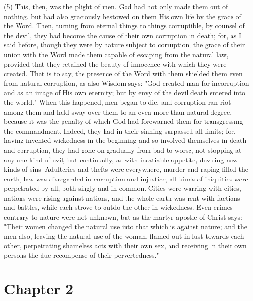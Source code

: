 \documentclass[9pt, twocolumn, oneside, a4paper]{memoir}
\begin{document}
\textsc{(5)} This, then, was the plight of men. God had not only       made them out of nothing, but had also graciously bestowed on them His own life       by the grace of the Word. Then, turning from eternal things to things       corruptible, by counsel of the devil, they had become the cause of their own       corruption in death; for, as I said before, though they were by nature subject       to corruption, the grace of their union with the Word made them capable of       escaping from the natural law, provided that they retained the beauty of       innocence with which they were created. That is to say, the presence of the Word       with them shielded them even from natural corruption, as also Wisdom says:       "God created man for incorruption and as an image of       His own eternity; but by envy of the devil death entered into the world."       When this happened, men began to die, and corruption ran riot among them and held       sway over them to an even more than natural degree, because it was the penalty       of which God had forewarned them for transgressing the commandment. Indeed, they       had in their sinning surpassed all limits; for, having invented wickedness in       the beginning and so involved themselves in death and corruption, they had gone       on gradually from bad to worse, not stopping at any one kind of evil, but       continually, as with insatiable appetite, devising new kinds of sins. Adulteries       and thefts were everywhere, murder and raping filled the earth, law was       disregarded in corruption and injustice, all kinds of iniquities were       perpetrated by all, both singly and in common. Cities were warring with cities,       nations were rising against nations, and the whole earth was rent with factions       and battles, while each strove to outdo the other in wickedness. Even crimes       contrary to nature were not unknown, but as the martyr-apostle of Christ says:       "Their women changed the natural use into that which       is against nature; and the men also, leaving the natural use of the woman,       flamed out in lust towards each other, perpetrating shameless acts with their       own sex, and receiving in their own persons the due recompense of their       pervertedness."

\section*{Chapter 2}
\end{document}
